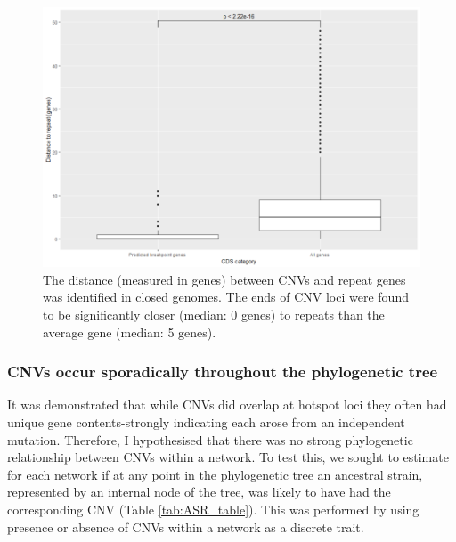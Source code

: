 \documentclass{article}
\begin{document}
\begin{figure}[h!]
\centering
\includegraphics[width=\textwidth{}]{Chapter_1/Picture1.png}
\caption{The distance (measured in genes) between CNVs and repeat genes was identified in closed genomes. The ends of CNV loci were found to be significantly closer (median: 0 genes) to repeats than the average gene (median: 5 genes).}
\label{fig:CNVs_close_to_repeats}
\end{figure}

\subsubsection{CNVs occur sporadically throughout the phylogenetic tree}
It was demonstrated that while CNVs did overlap at hotspot loci they often had unique gene contents-strongly indicating each arose from an independent mutation. Therefore, I hypothesised that there was no strong phylogenetic relationship between CNVs within a network. To test this, we sought to estimate for each network if at any point in the phylogenetic tree an ancestral strain, represented by an internal node of the tree, was likely to have had the corresponding CNV (Table \ref{tab:ASR_table}). This was performed by using presence or absence of CNVs within a network as a discrete trait.
\end{document}
